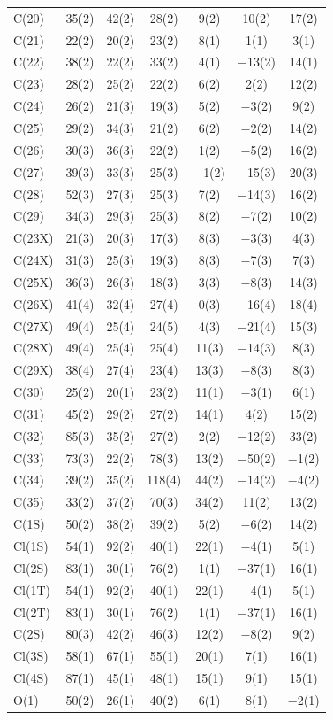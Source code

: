 \begin{center}
{\begin{supertabular}{lcccccc}
C(20)&35(2) &42(2)&28(2) &9(2)&10(2) &17(2)\\
C(21)&22(2) &20(2)&23(2) &8(1)&1(1) &3(1)\\
C(22)&38(2) &22(2)&33(2) &4(1)&$-$13(2) &14(1)\\
C(23)&28(2) &25(2)&22(2) &6(2)&2(2) &12(2)\\
C(24)&26(2) &21(3)&19(3) &5(2)&$-$3(2) &9(2)\\
C(25)&29(2) &34(3)&21(2) &6(2)&$-$2(2) &14(2)\\
C(26)&30(3) &36(3)&22(2) &1(2)&$-$5(2) &16(2)\\
C(27)&39(3) &33(3)&25(3) &$-$1(2)&$-$15(3) &20(3)\\
C(28)&52(3) &27(3)&25(3) &7(2)&$-$14(3) &16(2)\\
C(29)&34(3) &29(3)&25(3) &8(2)&$-$7(2) &10(2)\\
C(23X)&21(3) &20(3)&17(3) &8(3)&$-$3(3) &4(3)\\
C(24X)&31(3) &25(3)&19(3) &8(3)&$-$7(3) &7(3)\\
C(25X)&36(3) &26(3)&18(3) &3(3)&$-$8(3) &14(3)\\
C(26X)&41(4) &32(4)&27(4) &0(3)&$-$16(4) &18(4)\\
C(27X)&49(4) &25(4)&24(5) &4(3)&$-$21(4) &15(3)\\
C(28X)&49(4) &25(4)&25(4) &11(3)&$-$14(3) &8(3)\\
C(29X)&38(4) &27(4)&23(4) &13(3)&$-$8(3) &8(3)\\
C(30)&25(2) &20(1)&23(2) &11(1)&$-$3(1) &6(1)\\
C(31)&45(2) &29(2)&27(2) &14(1)&4(2) &15(2)\\
C(32)&85(3) &35(2)&27(2) &2(2)&$-$12(2) &33(2)\\
C(33)&73(3) &22(2)&78(3) &13(2)&$-$50(2) &$-$1(2)\\
C(34)&39(2) &35(2)&118(4) &44(2)&$-$14(2) &$-$4(2)\\
C(35)&33(2) &37(2)&70(3) &34(2)&11(2) &13(2)\\
C(1S)&50(2) &38(2)&39(2) &5(2)&$-$6(2) &14(2)\\
Cl(1S)&54(1) &92(2)&40(1) &22(1)&$-$4(1) &5(1)\\
Cl(2S)&83(1) &30(1)&76(2) &1(1)&$-$37(1) &16(1)\\
Cl(1T)&54(1) &92(2)&40(1) &22(1)&$-$4(1) &5(1)\\
Cl(2T)&83(1) &30(1)&76(2) &1(1)&$-$37(1) &16(1)\\
C(2S)&80(3) &42(2)&46(3) &12(2)&$-$8(2) &9(2)\\
Cl(3S)&58(1) &67(1)&55(1) &20(1)&7(1) &16(1)\\
Cl(4S)&87(1) &45(1)&48(1) &15(1)&9(1) &15(1)\\
O(1)&50(2) &26(1)&40(2) &6(1)&8(1) &$-$2(1)\\
\end{supertabular}
}
\end{center}

